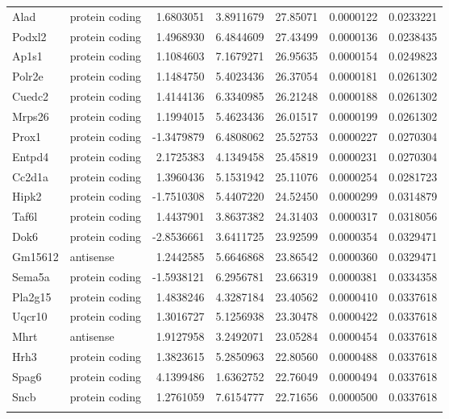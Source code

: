 \documentclass[onehalf,12pt]{beavtex}
\begin{document}
\begin{longtable}{llrrrrr}
  \addlinespace
  Alad & protein coding & 1.6803051 & 3.8911679 & 27.85071 & 0.0000122 & 0.0233221\\
  Podxl2 & protein coding & 1.4968930 & 6.4844609 & 27.43499 & 0.0000136 & 0.0238435\\
  Ap1s1 & protein coding & 1.1084603 & 7.1679271 & 26.95635 & 0.0000154 & 0.0249823\\
  Polr2e & protein coding & 1.1484750 & 5.4023436 & 26.37054 & 0.0000181 & 0.0261302\\
  Cuedc2 & protein coding & 1.4144136 & 6.3340985 & 26.21248 & 0.0000188 & 0.0261302\\
  \addlinespace
  Mrps26 & protein coding & 1.1994015 & 5.4623436 & 26.01517 & 0.0000199 & 0.0261302\\
  Prox1 & protein coding & -1.3479879 & 6.4808062 & 25.52753 & 0.0000227 & 0.0270304\\
  Entpd4 & protein coding & 2.1725383 & 4.1349458 & 25.45819 & 0.0000231 & 0.0270304\\
  Cc2d1a & protein coding & 1.3960436 & 5.1531942 & 25.11076 & 0.0000254 & 0.0281723\\
  Hipk2 & protein coding & -1.7510308 & 5.4407220 & 24.52450 & 0.0000299 & 0.0314879\\
  \addlinespace
  Taf6l & protein coding & 1.4437901 & 3.8637382 & 24.31403 & 0.0000317 & 0.0318056\\
  Dok6 & protein coding & -2.8536661 & 3.6411725 & 23.92599 & 0.0000354 & 0.0329471\\
  Gm15612 & antisense & 1.2442585 & 5.6646868 & 23.86542 & 0.0000360 & 0.0329471\\
  Sema5a & protein coding & -1.5938121 & 6.2956781 & 23.66319 & 0.0000381 & 0.0334358\\
  Pla2g15 & protein coding & 1.4838246 & 4.3287184 & 23.40562 & 0.0000410 & 0.0337618\\
  \addlinespace
  Uqcr10 & protein coding & 1.3016727 & 5.1256938 & 23.30478 & 0.0000422 & 0.0337618\\
  Mhrt & antisense & 1.9127958 & 3.2492071 & 23.05284 & 0.0000454 & 0.0337618\\
  Hrh3 & protein coding & 1.3823615 & 5.2850963 & 22.80560 & 0.0000488 & 0.0337618\\
  Spag6 & protein coding & 4.1399486 & 1.6362752 & 22.76049 & 0.0000494 & 0.0337618\\
  Sncb & protein coding & 1.2761059 & 7.6154777 & 22.71656 & 0.0000500 & 0.0337618\\
  \addlinespace

\end{longtable}
\end{document}
